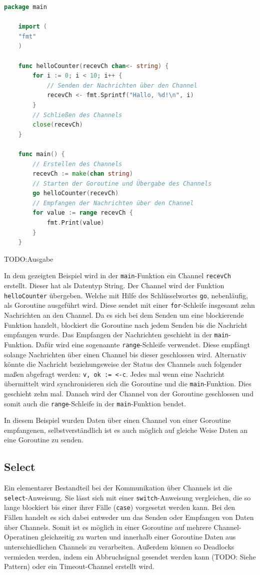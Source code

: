 \documentclass[fontsize=12pt,paper=a4,twoside=semi,parskip=half-,headsepline,headinclude]{scrreprt}
\begin{document}
\begin{lstlisting}[language=Go,extendedchars=true]
	package main

	import (
	"fmt"
	)

	func helloCounter(recevCh chan<- string) {
		for i := 0; i < 10; i++ {
			// Senden der Nachrichten über den Channel
			recevCh <- fmt.Sprintf("Hallo, %d!\n", i)
		}
		// Schließen des Channels
		close(recevCh)
	}

	func main() {
		// Erstellen des Channels
		recevCh := make(chan string)
		// Starten der Goroutine und Übergabe des Channels
		go helloCounter(recevCh)
		// Empfangen der Nachrichten über den Channel
		for value := range recevCh {
			fmt.Print(value)
		}
	}
\end{lstlisting}
TODO:Ausgabe

In dem gezeigten Beispiel wird in der \texttt{main}-Funktion ein Channel \texttt{recevCh} erstellt. Dieser hat als Datentyp String. Der Channel wird der Funktion \texttt{helloCounter} übergeben. Welche mit Hilfe des Schlüsselwortes \texttt{go}, nebenläufig, als Goroutine ausgeführt wird. Diese sendet mit einer \texttt{for}-Schleife insgesamt zehn Nachrichten an den Channel. Da es sich bei dem Senden um eine blockierende Funktion handelt, blockiert die Goroutine nach jedem Senden bis die Nachricht empfangen wurde. Das Empfangen der Nachrichten geschieht in der \texttt{main}-Funktion. Dafür wird eine sogenannte \texttt{range}-Schleife verwendet. Diese empfängt solange Nachrichten über einen Channel bis dieser geschlossen wird. Alternativ könnte die Nachricht beziehungsweise der Status des Channels auch folgender maßen abgefragt werden: \texttt{v, ok := <-c}. Jedes mal wenn eine Nachricht übermittelt wird synchronisieren sich die Goroutine und die \texttt{main}-Funktion. Dies geschieht zehn mal. Danach wird der Channel von der Goroutine geschlossen und somit auch die \texttt{range}-Schleife in der \texttt{main}-Funktion bendet.

In diesem Beispiel wurden Daten über einen Channel von einer Goroutine empfangenen, selbstverständlich ist es auch möglich auf gleiche Weise Daten an eine Goroutine zu senden.

\subsection{Select}

Ein elementarer Bestandteil bei der Kommunikation über Channels ist die \texttt{select}-Anweisung. Sie lässt sich mit einer \texttt{switch}-Anweisung vergleichen, die so lange blockiert bis einer ihrer Fälle (\texttt{case}) vorgesetzt werden kann. Bei den Fällen handelt es sich dabei entweder um das Senden oder Empfangen von Daten über Channels. Somit ist es möglich in einer Goroutine auf mehrere Channel-Operatinen gleichzeitig zu warten und innerhalb einer Goroutine Daten aus unterschiedlichen Channels zu verarbeiten. Außerdem können so Deadlocks vermieden werden, indem ein Abbruchsignal gesendet werden kann (TODO: Siehe Pattern) oder ein Timeout-Channel erstellt wird.
\end{document}
